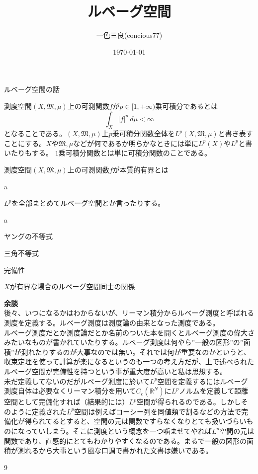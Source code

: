 \documentclass[leqno]{jsarticle}
\title{ルベーグ空間}
\author{一色三良(concious77)}
\date{\today}
\newcommand{\rr}{\mathbb{R}}
\newcommand{\mgn}{\infty}
\newcommand{\mm}{\mathfrak{M}}
\begin{document}
\maketitle
ルベーグ空間の話

{\df[$p$乗可積分]測度空間$(X,\mm,\mu)$上の可測関数$f$が$p\in [1,+\mgn)$乗可積分であるとは
\[
\int_X|f|^p\ d\mu<\mgn
\]
となることである。$(X,\mm,\mu)$上$p$乗可積分関数全体を$L^p(X,\mm,\mu)$と書き表すことにする。$X$や$\mm,\mu$などが何であるか明らかなときには単に$L^p(X)$や$L^p$と書いたりもする。
}
{\cau
$1$乗可積分関数とは単に可積分関数のことである。
}

{\df[本質的有界]
測度空間$(X,\mm,\mu)$上の可測関数$f$が本質的有界とは
}

{\df[空間$L^{\mgn}$]
a
}

$L^p$を全部まとめてルベーグ空間とか言ったりする。

{\df[ルベーグ空間のノルム]
a
}

{\lem
ヤングの不等式
}

{\prop
三角不等式
}

{\thm
完備性
}

{\thm
$X$が有界な場合のルベーグ空間同士の関係
}



{\bf 余談}\\ 
後々、いつになるかはわからないが、リーマン積分からルベーグ測度と呼ばれる測度を定義する。ルベーグ測度は測度論の由来となった測度である。\\ 
ルベーグ測度だとか測度論だとか名前のついた本を開くとルベーグ測度の偉大さみたいなものが書かれていたりする。ルベーグ測度は何やら”一般の図形”の”面積”が測れたりするのが大事なのでは無い。それでは何が重要なのかというと、収束定理を使って計算が楽になるというのも一つの考え方だが、上で述べられたルベーグ空間が完備性を持つという事が重大度が高いと私は思想する。\\ 
未だ定義してないのだがルベーグ測度に於いて$L^p$空間を定義するにはルベーグ測度自体は必要なくリーマン積分を用いて$C_c(\rr^N)$に$L^p$ノルムを定義して距離空間として完備化すれば（結果的には）$L^p$空間が得られるのである。しかしそのように定義された$L^p$空間は例えばコーシー列を同値類で割るなどの方法で完備化が得られてるとすると、空間の元は関数ですらなくなりとても扱いづらいものになっていしまう。そこに測度という概念を一つ噛ませてやれば$L^p$空間の元は関数であり、直感的にとてもわかりやすくなるのである。まるで一般の図形の面積が測れるから大事という風な口調で書かれた文書は嫌いである。









	
\begin{thebibliography}{9}

\end{thebibliography}




			
\end{document}
